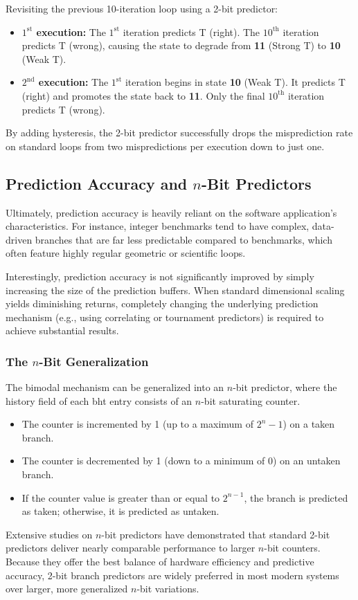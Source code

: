 Revisiting the previous 10-iteration loop using a 2-bit predictor:
\begin{itemize}
    \item \textbf{\(1^{\text{st}}\) execution:} The \(1^{\text{st}}\) iteration predicts T (right). The \(10^{\text{th}}\) iteration predicts T (wrong), causing the state to degrade from \textbf{11} (Strong T) to \textbf{10} (Weak T).
    \item \textbf{\(2^{\text{nd}}\) execution:} The \(1^{\text{st}}\) iteration begins in state \textbf{10} (Weak T). It predicts T (right) and promotes the state back to \textbf{11}. Only the final \(10^{\text{th}}\) iteration predicts T (wrong).
\end{itemize}
By adding hysteresis, the 2-bit predictor successfully drops the misprediction rate on standard loops from two mispredictions per execution down to just one.

\subsection{Prediction Accuracy and \texorpdfstring{\(n\)}{n}-Bit Predictors}

Ultimately, prediction accuracy is heavily reliant on the software application's characteristics. For instance, integer benchmarks tend to have complex, data-driven branches that are far less predictable compared to  benchmarks, which often feature highly regular geometric or scientific loops.

Interestingly, prediction accuracy is not significantly improved by simply increasing the size of the prediction buffers. When standard dimensional scaling yields diminishing returns, completely changing the underlying prediction mechanism (e.g., using correlating or tournament predictors) is required to achieve substantial results.

\subsubsection*{The \(n\)-Bit Generalization}
The bimodal mechanism can be generalized into an \(n\)-bit predictor, where the history field of each \gls{bht} entry consists of an \(n\)-bit saturating counter. 
\begin{itemize}
    \item The counter is incremented by 1 (up to a maximum of \(2^n - 1\)) on a taken branch.
    \item The counter is decremented by 1 (down to a minimum of 0) on an untaken branch.
    \item If the counter value is greater than or equal to \(2^{n-1}\), the branch is predicted as taken; otherwise, it is predicted as untaken.
\end{itemize}
Extensive studies on \(n\)-bit predictors have demonstrated that standard 2-bit predictors deliver nearly comparable performance to larger \(n\)-bit counters. Because they offer the best balance of hardware efficiency and predictive accuracy, 2-bit branch predictors are widely preferred in most modern systems over larger, more generalized \(n\)-bit variations.

